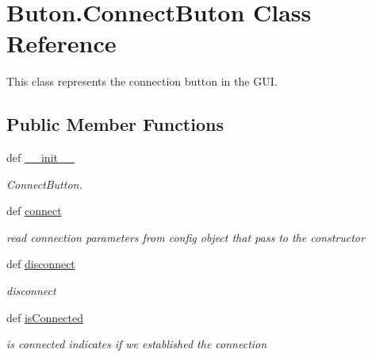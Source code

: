 \hypertarget{classButon_1_1ConnectButon}{\section{Buton.\+Connect\+Buton Class Reference}
\label{classButon_1_1ConnectButon}
}


This class represents the connection button in the G\+U\+I.  


\subsection*{Public Member Functions}
\begin{DoxyCompactItemize}
\item 
def \hyperlink{classButon_1_1ConnectButon_acf802f45e38318e1784d66d6fe9b8e47}{\+\_\+\+\_\+init\+\_\+\+\_\+}
\begin{DoxyCompactList}\small\item\em Connect\+Button. \end{DoxyCompactList}\item 
\hypertarget{classButon_1_1ConnectButon_a988f984422f32ca5b2300f3f8d741ef7}{def \hyperlink{classButon_1_1ConnectButon_a988f984422f32ca5b2300f3f8d741ef7}{connect}}\label{classButon_1_1ConnectButon_a988f984422f32ca5b2300f3f8d741ef7}

\begin{DoxyCompactList}\small\item\em read connection parameters from config object that pass to the constructor \end{DoxyCompactList}\item 
\hypertarget{classButon_1_1ConnectButon_ab65e33859d27de3b86b9863a058c7984}{def \hyperlink{classButon_1_1ConnectButon_ab65e33859d27de3b86b9863a058c7984}{disconnect}}\label{classButon_1_1ConnectButon_ab65e33859d27de3b86b9863a058c7984}

\begin{DoxyCompactList}\small\item\em disconnect \end{DoxyCompactList}\item 
\hypertarget{classButon_1_1ConnectButon_a12d90ccbd5ded3f1563d56bd7ac7b5a7}{def \hyperlink{classButon_1_1ConnectButon_a12d90ccbd5ded3f1563d56bd7ac7b5a7}{is\+Connected}}\label{classButon_1_1ConnectButon_a12d90ccbd5ded3f1563d56bd7ac7b5a7}

\begin{DoxyCompactList}\small\item\em is connected indicates if we established the connection \end{DoxyCompactList}\end{DoxyCompactItemize}
